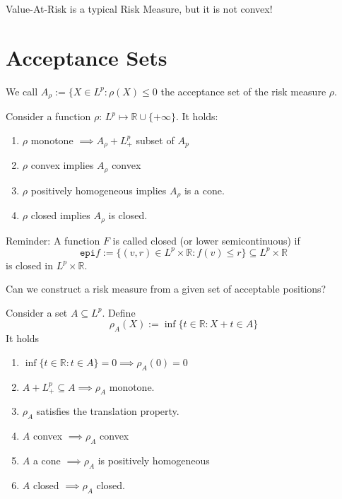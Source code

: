 Value-At-Risk is a typical Risk Measure, but it is not convex!

\section{Acceptance Sets}
We call $A_\rho:=\{ X \in L^p: \rho(X) \leq 0$ the acceptance set of the risk measure $\rho$.
\begin{lemma}\label{lem:rudloff_lemma1}
	Consider a function $\rho$: $L^p\mapsto \mathbb{R}\cup\{+\infty\}$. It holds:
	\begin{enumerate}
		\item $\rho$ monotone $\implies A_\rho + L^p_+$ subset of $A_p$
		\item $\rho$ convex implies $A_\rho$ convex
		\item $\rho$ positively homogeneous implies $A_\rho$ is a cone.
		\item $\rho$ closed implies $A_\rho$ is closed.
	\end{enumerate}
	
\end{lemma}

Reminder: A function $F$ is called closed (or lower semicontinuous) if \begin{equation}
	\texttt{epi} f := \{ (v,r) \in L^p \times \mathbb{R}: f(v) \leq r \} \subseteq L^p\times \mathbb{R}
\end{equation}
is closed in $L^p\times \mathbb{R}$.

Can we construct a risk measure from a given set of acceptable positions?
\begin{lemma}\label{lem:rudloff_lemma2}
	Consider a set $A\subseteq L^p$. Define
	\begin{equation}
		\rho_A(X) := \inf \{ t \in \mathbb{R}: X + t \in A \}
	\end{equation}
	It holds
	\begin{enumerate}
		\item $\inf \{ t \in \mathbb{R} : t \in A\} = 0 \implies \rho_A(0) =0 $
		\item $A+ L_+^p \subseteq A \implies \rho_A$ monotone.
		\item $\rho_A$ satisfies the translation property.
		\item $A$ convex $\implies \rho_A$ convex
		\item $A$ a cone $\implies \rho_A$ is positively homogeneous
		\item $A$ closed $\implies \rho_A$ closed.
	\end{enumerate}
\end{lemma}

